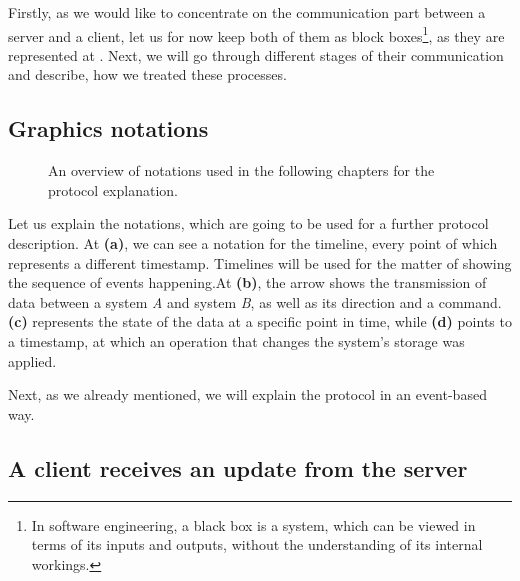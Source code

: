 Firstly, as we would like to concentrate on the communication part between a server and a client, let us for now keep both of them as block boxes\footnote{In software engineering, a black box is a system, which can be viewed in terms of its inputs and outputs, without the understanding of its internal workings.\cite{49}}, as they are represented at . Next, we will go through different stages of their communication and describe, how we treated these processes. 

\subsection*{Graphics notations}

\begin{figure}[!htb]
    \centering
    \def\svgwidth{0.35\linewidth}
    \subfloat[]{{}}%
    \qquad
    \def\svgwidth{0.35\linewidth}
    \subfloat[]{{}}%
 \def\svgwidth{0.35\linewidth}
    \subfloat[]{{}}%
    \qquad
 \def\svgwidth{0.35\linewidth}
    \subfloat[]{{}}%
    \qquad
    \caption{An overview of notations used in the following chapters for the protocol explanation.}%
    \label{fig:notations}%
\end{figure}

Let us explain the notations, which are going to be used for a further protocol description. At  \textbf{(a)}, we can see a notation for the timeline, every point of which represents a different timestamp. Timelines will be used for the matter of showing the sequence of events happening.At  \textbf{(b)}, the arrow shows the transmission of data between a system \textit{A} and system \textit{B}, as well as its direction and a command.  \textbf{(c)} represents the state of the data at a specific point in time, while  \textbf{(d)} points to a timestamp, at which an operation that changes the system's storage was applied.

Next, as we already mentioned, we will explain the protocol in an event-based way. 

\subsection*{A client receives an update from the server}

